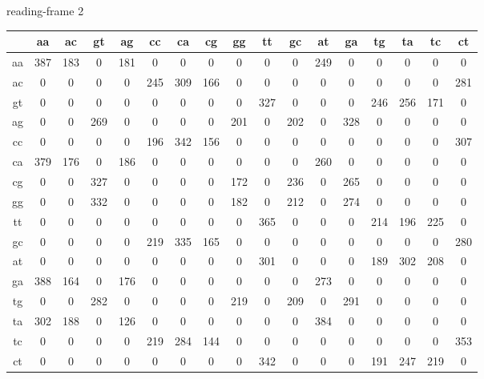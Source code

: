 \documentclass{homework}
\begin{document}
\begin{enumerate}
\begin{enumerate}
\normalsize
reading-frame 2
\tiny

\begin{tabular}{c|cccccccccccccccc}
   & aa & ac & gt & ag & cc & ca & cg & gg & tt & gc & at & ga & tg & ta & tc & ct\\\hline
aa & 387 & 183 &   0 & 181 &   0 &   0 &   0 &   0 &   0 &   0 & 249 &   0 &   0 &   0 &   0 &   0\\
ac &   0 &   0 &   0 &   0 & 245 & 309 & 166 &   0 &   0 &   0 &   0 &   0 &   0 &   0 &   0 & 281\\
gt &   0 &   0 &   0 &   0 &   0 &   0 &   0 &   0 & 327 &   0 &   0 &   0 & 246 & 256 & 171 &   0\\
ag &   0 &   0 & 269 &   0 &   0 &   0 &   0 & 201 &   0 & 202 &   0 & 328 &   0 &   0 &   0 &   0\\
cc &   0 &   0 &   0 &   0 & 196 & 342 & 156 &   0 &   0 &   0 &   0 &   0 &   0 &   0 &   0 & 307\\
ca & 379 & 176 &   0 & 186 &   0 &   0 &   0 &   0 &   0 &   0 & 260 &   0 &   0 &   0 &   0 &   0\\
cg &   0 &   0 & 327 &   0 &   0 &   0 &   0 & 172 &   0 & 236 &   0 & 265 &   0 &   0 &   0 &   0\\
gg &   0 &   0 & 332 &   0 &   0 &   0 &   0 & 182 &   0 & 212 &   0 & 274 &   0 &   0 &   0 &   0\\
tt &   0 &   0 &   0 &   0 &   0 &   0 &   0 &   0 & 365 &   0 &   0 &   0 & 214 & 196 & 225 &   0\\
gc &   0 &   0 &   0 &   0 & 219 & 335 & 165 &   0 &   0 &   0 &   0 &   0 &   0 &   0 &   0 & 280\\
at &   0 &   0 &   0 &   0 &   0 &   0 &   0 &   0 & 301 &   0 &   0 &   0 & 189 & 302 & 208 &   0\\
ga & 388 & 164 &   0 & 176 &   0 &   0 &   0 &   0 &   0 &   0 & 273 &   0 &   0 &   0 &   0 &   0\\
tg &   0 &   0 & 282 &   0 &   0 &   0 &   0 & 219 &   0 & 209 &   0 & 291 &   0 &   0 &   0 &   0\\
ta & 302 & 188 &   0 & 126 &   0 &   0 &   0 &   0 &   0 &   0 & 384 &   0 &   0 &   0 &   0 &   0\\
tc &   0 &   0 &   0 &   0 & 219 & 284 & 144 &   0 &   0 &   0 &   0 &   0 &   0 &   0 &   0 & 353\\
ct &   0 &   0 &   0 &   0 &   0 &   0 &   0 &   0 & 342 &   0 &   0 &   0 & 191 & 247 & 219 &   0\\
\end{tabular}


\end{enumerate}
\end{enumerate}
\end{document}
